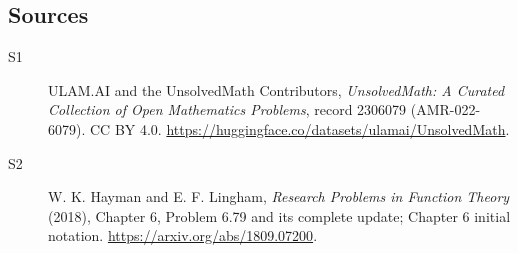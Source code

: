 \documentclass[11pt]{article}
\begin{document}
\subsection{Sources}
\begin{description}
\item[\hypertarget{source:2306079:1}{S1}] ULAM.AI and the UnsolvedMath Contributors, \emph{UnsolvedMath: A Curated Collection of Open Mathematics Problems}, record 2306079 (AMR-022-6079). CC BY 4.0. \url{https://huggingface.co/datasets/ulamai/UnsolvedMath}.
\item[\hypertarget{source:2306079:2}{S2}] W. K. Hayman and E. F. Lingham, \emph{Research Problems in Function Theory} (2018), Chapter 6, Problem 6.79 and its complete update; Chapter 6 initial notation. \url{https://arxiv.org/abs/1809.07200}.
\end{description}
\label{end:2306079}
\end{document}
